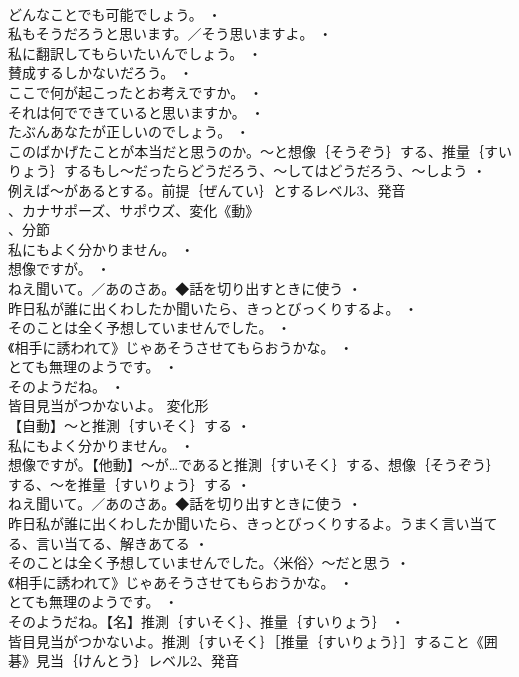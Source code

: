 \documentclass[8pt]{extreport}
\begin{document}
\begin{CJK}{UTF8}{min}
\\	どんなことでも可能でしょう。 ・
\\	私もそうだろうと思います。／そう思いますよ。 ・
\\	私に翻訳してもらいたいんでしょう。 ・
\\	賛成するしかないだろう。 ・
\\	ここで何が起こったとお考えですか。 ・
\\	それは何でできていると思いますか。 ・
\\	たぶんあなたが正しいのでしょう。 ・
\\	このばかげたことが本当だと思うのか。～と想像｛そうぞう｝する、推量｛すいりょう｝するもし～だったらどうだろう、～してはどうだろう、～しよう ・
\\	例えば～があるとする。前提｛ぜんてい｝とするレベル3、発音
\\	、カナサポーズ、サポウズ、変化《動》
\\	、分節
\\	私にもよく分かりません。 ・
\\	想像ですが。 ・
\\	ねえ聞いて。／あのさあ。◆話を切り出すときに使う ・
\\	昨日私が誰に出くわしたか聞いたら、きっとびっくりするよ。 ・
\\	そのことは全く予想していませんでした。 ・
\\	《相手に誘われて》じゃあそうさせてもらおうかな。 ・
\\	とても無理のようです。 ・
\\	そのようだね。 ・
\\	皆目見当がつかないよ。	変化形 
\\	【自動】～と推測｛すいそく｝する ・
\\	私にもよく分かりません。 ・
\\	想像ですが。【他動】～が…であると推測｛すいそく｝する、想像｛そうぞう｝する、～を推量｛すいりょう｝する ・
\\	ねえ聞いて。／あのさあ。◆話を切り出すときに使う ・
\\	昨日私が誰に出くわしたか聞いたら、きっとびっくりするよ。うまく言い当てる、言い当てる、解きあてる ・
\\	そのことは全く予想していませんでした。〈米俗〉～だと思う ・
\\	《相手に誘われて》じゃあそうさせてもらおうかな。 ・
\\	とても無理のようです。 ・
\\	そのようだね。【名】推測｛すいそく｝、推量｛すいりょう｝ ・
\\	皆目見当がつかないよ。推測｛すいそく｝［推量｛すいりょう｝］すること《囲碁》見当｛けんとう｝レベル2、発音

\end{CJK}
\end{document}
